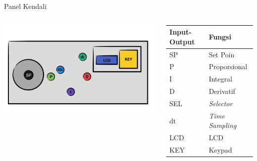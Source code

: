 \documentclass[10pt,xcolor={dvipsnames}]{beamer}
\begin{document}
	\begin{frame}{Panel Kendali}
		\begin{columns}[T]
			\begin{column}{0.6\textwidth}
				\centering
				\includegraphics[width=10cm]{Gambar Lain/KONTORU.jpg}
			\end{column}
			\begin{column}{0.3\textwidth}
				\centering
				\begin{tabular}{ | m{1cm} | m{2cm}|} 
					\hline
					\textbf{Input-Output} & \textbf{Fungsi}\\
					\hline
					SP & Set Poin\\ 
					\hline
					P & Proporsional\\
					\hline
					I & Integral\\
					\hline
					D & Derivatif\\
					\hline
					SEL & \textit{Selector}\\
					\hline
					dt & \textit{Time Sampling}\\
					\hline
					LCD & LCD\\
					\hline
					KEY & Keypad \\
					\hline
				\end{tabular}
			\end{column}
		\end{columns}
	\end{frame}
\end{document}
